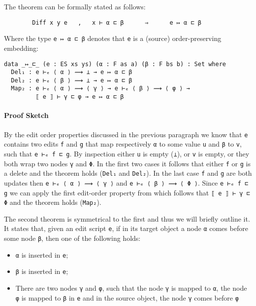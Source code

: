 \documentclass[preprint]{sigplanconf}
\begin{document}
    The theorem can be formally stated as follows:
\begin{verbatim}
        Diff x y e   ,   x ⊢ α ⊏ β      ⇒      e ↦ α ⊏ β
\end{verbatim}

    Where the type \texttt{e ↦ α ⊏ β} denotes that \texttt{e} is a (source) 
    order-preserving embedding:
\begin{verbatim}
data _↦_⊏_ (e : ES xs ys) (α : F as a) (β : F bs b) : Set where
  Del₁ : e ⊢ₑ ⟨ α ⟩ ⟿ ⊥ → e ↦ α ⊏ β
  Del₂ : e ⊢ₑ ⟨ β ⟩ ⟿ ⊥ → e ↦ α ⊏ β
  Map₂ : e ⊢ₑ ⟨ α ⟩ ⟿ ⟨ γ ⟩ → e ⊢ₑ ⟨ β ⟩ ⟿ ⟨ φ ⟩ → 
         ⟦ e ⟧ ⊢ γ ⊏ φ → e ↦ α ⊏ β
\end{verbatim}

    \paragraph{Proof Sketch} By the edit order properties discussed in the previous
    paragraph we know that \texttt{e} contains two edits \texttt{f} and \texttt{g}
    that map respectively \texttt{α} to some value \texttt{u} and \texttt{β} to
    \texttt{v}, such that \texttt{e ⊢ₑ f ⊏ g}. 
    By inspection either \texttt{u} is empty (\texttt{⊥}), or \texttt{v}
    is empty, or they both wrap two nodes \texttt{γ} and \texttt{Φ}.
    In the first two cases it follows that either \texttt{f} or \texttt{g} is
    a delete and the theorem holds (\texttt{Del₁} and \texttt{Del₂}).
    In the last case \texttt{f} and \texttt{g} are both updates then 
    \texttt{e ⊢ₑ ⟨ α ⟩ ⟿ ⟨ γ ⟩} and \texttt{e ⊢ₑ ⟨ β ⟩ ⟿ ⟨ Φ ⟩}.
    Since \texttt{e ⊢ₑ f ⊏ g} we can apply the first edit-order property from
    which follows that \texttt{⟦ e ⟧ ⊢ γ ⊏ Φ} and the theorem holds (\texttt{Map₂}).

    The second theorem is symmetrical to the first and thus we will 
    briefly outline it.
    It states that, given an edit script \texttt{e}, if in its
    target object a node \texttt{α} comes before
    some node \texttt{β}, then one of the following holds:
    \begin{itemize}
            \item \texttt{α} is inserted in \texttt{e};
            \item \texttt{β} is inserted in \texttt{e};
            \item There are two nodes \texttt{γ} and \texttt{φ}, such that the node 
            \texttt{γ} is mapped to \texttt{α}, the node \texttt{φ} is mapped to 
            \texttt{β} in 	\texttt{e} and in the source object, 
            the node \texttt{γ} comes before \texttt{φ}
    \end{itemize}
\end{document}
